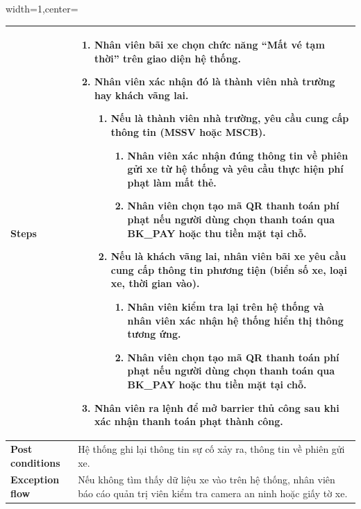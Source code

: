 \begin{adjustbox}{width=1\textwidth,center=\textwidth}
\begin{tabular}{|>{\centering\arraybackslash}m{3.5cm}|m{13.2cm}|}
\textbf{Steps} & 
\begin{enumerate}[label=\arabic*., leftmargin=1.5em, nosep]
    \item Nhân viên bãi xe chọn chức năng “Mất vé tạm thời” trên giao diện hệ thống.
    \item Nhân viên xác nhận đó là thành viên nhà trường hay khách vãng lai.
    \begin{enumerate}[label=2.\arabic*., leftmargin=2em, nosep]
        \item Nếu là thành viên nhà trường, yêu cầu cung cấp thông tin (MSSV hoặc MSCB).
        \begin{enumerate}[label=2.1.\arabic*., leftmargin=2.5em, nosep]
            \item Nhân viên xác nhận đúng thông tin về phiên gửi xe từ hệ thống và yêu cầu thực hiện phí phạt làm mất thẻ.
            \item Nhân viên chọn tạo mã QR thanh toán phí phạt nếu người dùng chọn thanh toán qua BK\_PAY hoặc thu tiền mặt tại chỗ.
        \end{enumerate}
        \item Nếu là khách vãng lai, nhân viên bãi xe yêu cầu cung cấp thông tin phương tiện (biển số xe, loại xe, thời gian vào).
        \begin{enumerate}[label=2.2.\arabic*., leftmargin=2.5em, nosep]
            \item Nhân viên kiểm tra lại trên hệ thống và nhân viên xác nhận hệ thống hiển thị thông tương ứng.
            \item Nhân viên chọn tạo mã QR thanh toán phí phạt nếu người dùng chọn thanh toán qua BK\_PAY hoặc thu tiền mặt tại chỗ.
        \end{enumerate}
    \end{enumerate}
    \item Nhân viên ra lệnh để mở barrier thủ công sau khi xác nhận thanh toán phạt thành công.
\end{enumerate} \\ \hline
\textbf{Post conditions} & Hệ thống ghi lại thông tin sự cố xảy ra, thông tin về phiên gửi xe. \\ \hline
\textbf{Exception flow} & Nếu không tìm thấy dữ liệu xe vào trên hệ thống, nhân viên báo cáo quản trị viên kiểm tra camera an ninh hoặc giấy tờ xe. \\ \hline
\end{tabular}
\end{adjustbox}
